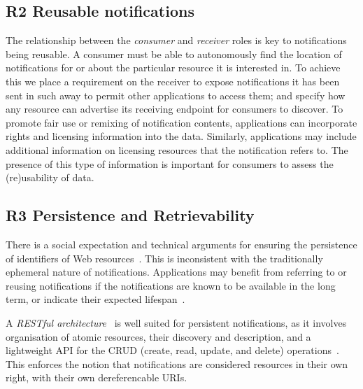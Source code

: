 \documentclass[a4paper]{llncs}
\begin{document}
                                \subsection{R2 Reusable notifications}
  \label{reusable-notifications}



\par The relationship between the {\em consumer} and {\em receiver} roles is key to notifications being reusable. A consumer must be able to autonomously find the location of notifications for or about the particular resource it is interested in. To achieve this we place a requirement on the receiver to expose notifications it has been sent in such away to permit other applications to access them; and specify how any resource can advertise its receiving endpoint for consumers to discover. To promote fair use or remixing of notification contents, applications can incorporate rights and licensing information into the data. Similarly, applications may include additional information on licensing resources that the notification refers to. The presence of this type of information is important for consumers to assess the (re)usability of data.




                                \subsection{R3 Persistence and Retrievability}
  \label{persistence-and-retrievability}





\par There is a social expectation and technical arguments for ensuring the persistence of identifiers of Web resources~\cite{ref-11}. This is inconsistent with the traditionally ephemeral nature of notifications. Applications may benefit from referring to or reusing notifications if the notifications are known to be available in the long term, or indicate their expected lifespan~\cite{ref-12}.


\par A {\em RESTful architecture}~\cite{ref-13} is well suited for persistent notifications, as it involves organisation of atomic resources, their discovery and description, and a lightweight API for the CRUD (create, read, update, and delete) operations~\cite{ref-14}. This enforces the notion that notifications are considered resources in their own right, with their own dereferencable URIs.
\end{document}
